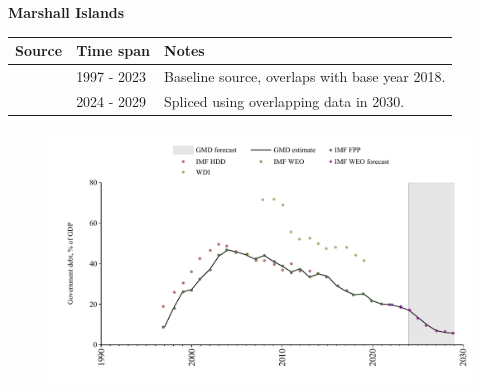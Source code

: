 \documentclass[12pt,a4paper,landscape]{article}
\begin{document}
\begin{adjustbox}{max totalsize={\paperwidth}{\paperheight},center}
\begin{minipage}[t][\textheight][t]{\textwidth}
\vspace*{0.5cm}
{}
\begin{center}
{\Large\bfseries Marshall Islands}
\end{center}
\vspace{0.5cm}
\begin{table}[H]
\centering
\small
\begin{tabular}{|l|l|l|}
\hline
\textbf{Source} & \textbf{Time span} & \textbf{Notes} \\
\hline
\rowcolor{white}\cite{IMF_FPP}& 1997 - 2023 &Baseline source, overlaps with base year 2018.\\
\rowcolor{lightgray}\cite{IMF_WEO_forecast}& 2024 - 2029 &Spliced using overlapping data in 2030.\\
\hline
\end{tabular}
\end{table}
\begin{figure}[H]
\centering
\includegraphics[width=\textwidth,height=0.6\textheight,keepaspectratio]{graphs/MHL_govdebt_GDP.pdf}
\end{figure}
\end{minipage}
\end{adjustbox}
\end{document}
